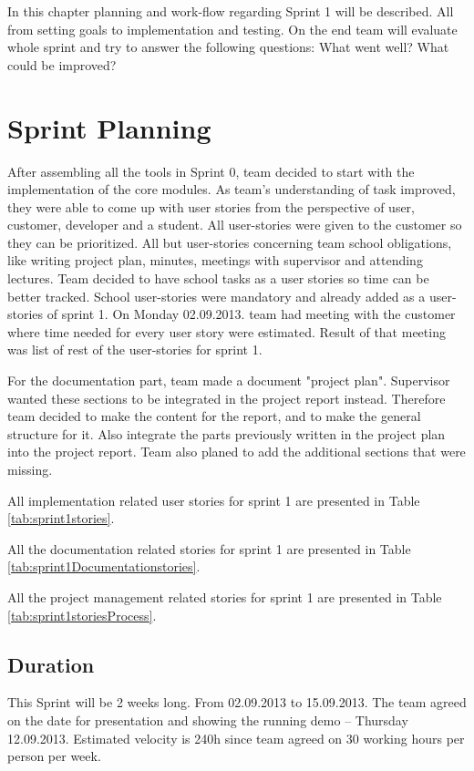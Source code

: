 In this chapter planning and work-flow regarding Sprint 1 will be described. 
All from setting  goals to implementation and testing. On the end team will evaluate whole sprint and try to answer the following questions: What went well? What could be improved? 


\section{Sprint Planning}
After assembling all the tools in Sprint 0, team decided to start with the implementation of the core modules.
As team's understanding of task improved, they were able to come up with user stories from the perspective of user, customer, developer and a student.
All user-stories were given to the customer so they can be prioritized. 
All but user-stories concerning team school obligations, like writing project plan, minutes, meetings with supervisor and attending lectures.
Team decided to have school tasks as a user stories so time can be better tracked.
School user-stories were mandatory and already added as a user-stories of sprint 1.
On Monday 02.09.2013. team had meeting with the customer where time needed for every user story were estimated.
Result of that meeting was list of rest of the user-stories for sprint 1.

For the documentation part, team made a document "project plan". 
Supervisor wanted these sections to be integrated in the project report instead. 
Therefore team decided to make the content for the report, and to make the general structure for it. 
Also integrate the parts previously written in the project plan into the project report. 
Team also planed to add the additional sections that were missing.

All implementation related user stories for sprint 1 are presented in Table \ref{tab:sprint1stories}.

All the documentation related stories for sprint 1 are presented in Table \ref{tab:sprint1Documentationstories}.

All the project management related stories for sprint 1 are presented in Table \ref{tab:sprint1storiesProcess}.


\newpage
\subsection{Duration}
This Sprint will be 2 weeks long. From 02.09.2013 to 15.09.2013.
The team agreed on the date for presentation and showing the running demo -- Thursday 12.09.2013.
Estimated velocity is 240h since team agreed on 30 working hours per person per week.

